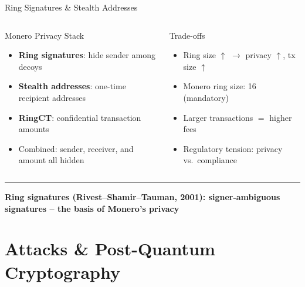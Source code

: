 \documentclass[8pt,aspectratio=169]{beamer}
\newcommand{\bottomnote}[1]{\vfill\vspace{-2mm}\textcolor{mllavender2}{\rule{\textwidth}{0.4pt}}\vspace{1mm}\footnotesize\textbf{#1}}
\begin{document}
\begin{frame}{Ring Signatures \& Stealth Addresses}
\begin{columns}
\begin{block}{Monero Privacy Stack}
\begin{itemize}\small
  \item \textbf{Ring signatures}: hide sender among decoys
  \item \textbf{Stealth addresses}: one-time recipient addresses
  \item \textbf{RingCT}: confidential transaction amounts
  \item Combined: sender, receiver, and amount all hidden
\end{itemize}
\end{block}
\begin{block}{Trade-offs}
\begin{itemize}\small
  \item Ring size $\uparrow$ $\to$ privacy $\uparrow$, tx size $\uparrow$
  \item Monero ring size: 16 (mandatory)
  \item Larger transactions $=$ higher fees
  \item Regulatory tension: privacy vs.\ compliance
\end{itemize}
\end{block}
\end{columns}
\bottomnote{Ring signatures (Rivest--Shamir--Tauman, 2001): signer-ambiguous signatures -- the basis of Monero's privacy}
\end{frame}

\section{Attacks \& Post-Quantum Cryptography}
\end{document}
